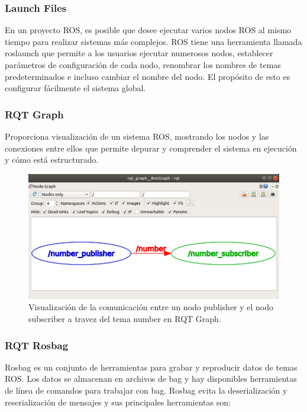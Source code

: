         \subsubsection{Launch Files}
            En un proyecto ROS, es posible que desee ejecutar varios nodos ROS al mismo tiempo para realizar sistemas más complejos. ROS tiene una herramienta llamada roslaunch que permite a los usuarios ejecutar numerosos nodos, establecer parámetros de configuración de cada nodo, renombrar los nombres de temas predeterminados e incluso cambiar el nombre del nodo. El propósito de esto es configurar fácilmente el sistema global.
            
        \subsubsection{RQT Graph}
            Proporciona visualización de un sistema ROS, mostrando los nodos y las conexiones entre ellos que permite depurar y comprender el sistema en ejecución y cómo está estructurado. 
            
            \begin{figure}[htb]
                \centering
                \includegraphics[width=1.0\linewidth]{Main/Chapter3/Images3/herramientas_1.png}
                \caption{Visualización de la comunicación entre un nodo publisher y el nodo subscriber a travez del tema number en RQT Graph.}
                \label{f:Cap3_herramientas_1}
            \end{figure}       
            
            
    \newpage    
    
            \subsubsection{RQT Rosbag}
                Rosbag es un conjunto de herramientas para grabar y reproducir datos de temas ROS. Los datos se almacenan en archivos de bag y hay disponibles herramientas de línea de comandos para trabajar con bag. Rosbag evita la deserialización y reserialización de mensajes y sus principales herramientas son:
                
